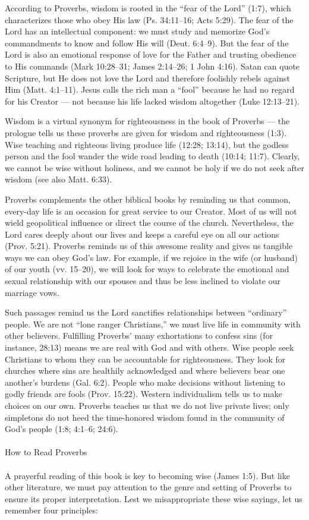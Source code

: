 According to Proverbs, wisdom is rooted in the “fear of the Lord” (1:7), which characterizes those who obey His law (Ps. 34:11–16; Acts 5:29). The fear of the Lord has an intellectual component: we must study and memorize God’s commandments to know and follow His will (Deut. 6:4–9). But the fear of the Lord is also an emotional response of love for the Father and trusting obedience to His commands (Mark 10:28–31; James 2:14–26; 1 John 4:16). Satan can quote Scripture, but He does not love the Lord and therefore foolishly rebels against Him (Matt. 4:1–11). Jesus calls the rich man a “fool” because he had no regard for his Creator — not because his life lacked wisdom altogether (Luke 12:13–21). 

Wisdom is a virtual synonym for righteousness in the book of Proverbs — the prologue tells us these proverbs are given for wisdom and righteousness (1:3). Wise teaching and righteous living produce life (12:28; 13:14), but the godless person and the fool wander the wide road leading to death (10:14; 11:7). Clearly, we cannot be wise without holiness, and we cannot be holy if we do not seek after wisdom (see also Matt. 6:33).

Proverbs complements the other biblical books by reminding us that common, every-day life is an occasion for great service to our Creator. Most of us will not wield geopolitical influence or direct the course of the church. Nevertheless, the Lord cares deeply about our lives and keeps a careful eye on all our actions (Prov. 5:21). Proverbs reminds us of this awesome reality and gives us tangible ways we can obey God’s law. For example, if we rejoice in the wife (or husband) of our youth (vv. 15–20), we will look for ways to celebrate the emotional and sexual relationship with our spouses and thus be less inclined to violate our marriage vows. 

Such passages remind us the Lord sanctifies relationships between “ordinary” people. We are not “lone ranger Christians,” we must live life in community with other believers. Fulfilling Proverbs’ many exhortations to confess sins (for instance, 28:13) means we are real with God and with others. Wise people seek Christians to whom they can be accountable for righteousness. They look for churches where sins are healthily acknowledged and where believers bear one another’s burdens (Gal. 6:2). People who make decisions without listening to godly friends are fools (Prov. 15:22). Western individualism tells us to make choices on our own. Proverbs teaches us that we do not live private lives; only simpletons do not heed the time-honored wisdom found in the community of God’s people (1:8; 4:1–6; 24:6). \\
\\
How to Read Proverbs\\
\\
A prayerful reading of this book is key to becoming wise (James 1:5). But like other literature, we must pay attention to the genre and setting of Proverbs to ensure its proper interpretation. Lest we misappropriate these wise sayings, let us remember four principles:

